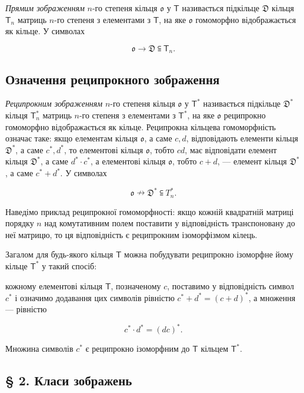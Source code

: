 \documentclass[11pt]{article}
\begin{document}
\emph{Прямим зображенням} \(n\)-го степеня кільця \(\mathfrak{o}\) у \(\mathsf T\) називається підкільце \(\mathfrak D\) кільця \(\mathsf T_n\) матриць \(n\)-го степеня з елементами з \(\mathsf T\), на яке \(\mathfrak{o}\) гомоморфно відображається як кільце. У символах

\[
\mathfrak{o}\to\mathfrak D\subseteqq\mathsf T_n.
\]

\subsection*{Означення реципрокного зображення}\label{definition-der-reziproken-darstellung}

\emph{Реципрокним зображенням} \(n\)-го степеня кільця \(\mathfrak{o}\) у \(\mathsf T^*\) називається підкільце \(\mathfrak D^*\) кільця \(\mathsf T_n^*\) матриць \(n\)-го степеня з елементами з \(\mathsf T^*\), на яке \(\mathfrak{o}\) реципрокно гомоморфно відображається як кільце. Реципрокна кільцева гомоморфність означає таке: якщо елементам кільця \(\mathfrak{o}\), а саме \(c,d\), відповідають елементи кільця \(\mathfrak D^*\), а саме \(c^*,d^*\), то елементові кільця \(\mathfrak{o}\), тобто \(cd\), має відповідати елемент кільця \(\mathfrak D^*\), а саме \(d^*\cdot c^*\), а елементові кільця \(\mathfrak{o}\), тобто \(c+d\), --- елемент кільця \(\mathfrak D^*\), а саме \(c^*+d^*\). У символах

\[
\mathfrak{o}\nrightarrow\mathfrak D^*\subseteqq T_n^*.
\]

Наведімо приклад реципрокної гомоморфності: якщо кожній квадратній матриці порядку \(n\) над комутативним полем поставити у відповідність транспоновану до неї матрицю, то ця відповідність є реципрокним ізоморфізмом кілець.

Загалом для будь-якого кільця \(\mathsf T\) можна побудувати реципрокно ізоморфне йому кільце \(\mathsf T^*\) у такий спосіб:

кожному елементові кільця \(\mathsf T\), позначеному \(c\), поставимо у відповідність символ \(c^*\) і означимо додавання цих символів рівністю \(c^*+d^*=(c+d)^*\), а множення --- рівністю

\[
c^*\cdot d^*=(dc)^*.
\]

Множина символів \(c^*\) є реципрокно ізоморфним до \(\mathsf T\) кільцем \(\mathsf T^*\).

\subsection*{§ 2. Класи зображень}\label{darstellungsklassen}
\end{document}
